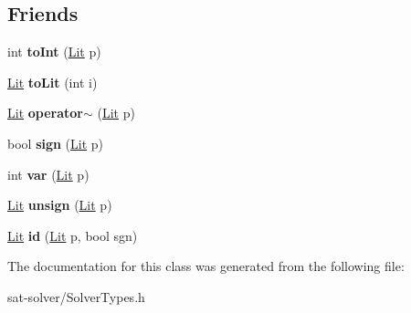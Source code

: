 \subsection*{\-Friends}
\begin{DoxyCompactItemize}
\item 
\hypertarget{classminisat_1_1Lit_a91d2f638120abed8e4805944d2c7cdfa}{int {\bfseries to\-Int} (\hyperlink{classminisat_1_1Lit}{\-Lit} p)}\label{classminisat_1_1Lit_a91d2f638120abed8e4805944d2c7cdfa}

\item 
\hypertarget{classminisat_1_1Lit_a6e64930cba3b8ce1e7eac81882c629da}{\hyperlink{classminisat_1_1Lit}{\-Lit} {\bfseries to\-Lit} (int i)}\label{classminisat_1_1Lit_a6e64930cba3b8ce1e7eac81882c629da}

\item 
\hypertarget{classminisat_1_1Lit_ab3d4f02961125d23e21b1006f9c864ea}{\hyperlink{classminisat_1_1Lit}{\-Lit} {\bfseries operator$\sim$} (\hyperlink{classminisat_1_1Lit}{\-Lit} p)}\label{classminisat_1_1Lit_ab3d4f02961125d23e21b1006f9c864ea}

\item 
\hypertarget{classminisat_1_1Lit_abac8837ff5c5dc924bd3167c1f3de4e3}{bool {\bfseries sign} (\hyperlink{classminisat_1_1Lit}{\-Lit} p)}\label{classminisat_1_1Lit_abac8837ff5c5dc924bd3167c1f3de4e3}

\item 
\hypertarget{classminisat_1_1Lit_ab6aab3ebb95e2adea129320703677ef2}{int {\bfseries var} (\hyperlink{classminisat_1_1Lit}{\-Lit} p)}\label{classminisat_1_1Lit_ab6aab3ebb95e2adea129320703677ef2}

\item 
\hypertarget{classminisat_1_1Lit_a0805f5aad4f501ef229f2f0679b8c7bb}{\hyperlink{classminisat_1_1Lit}{\-Lit} {\bfseries unsign} (\hyperlink{classminisat_1_1Lit}{\-Lit} p)}\label{classminisat_1_1Lit_a0805f5aad4f501ef229f2f0679b8c7bb}

\item 
\hypertarget{classminisat_1_1Lit_a0fcb5a149a59bd1d29e90dc27037ad8b}{\hyperlink{classminisat_1_1Lit}{\-Lit} {\bfseries id} (\hyperlink{classminisat_1_1Lit}{\-Lit} p, bool sgn)}\label{classminisat_1_1Lit_a0fcb5a149a59bd1d29e90dc27037ad8b}

\end{DoxyCompactItemize}


\-The documentation for this class was generated from the following file\-:\begin{DoxyCompactItemize}
\item 
sat-\/solver/\-Solver\-Types.\-h\end{DoxyCompactItemize}

